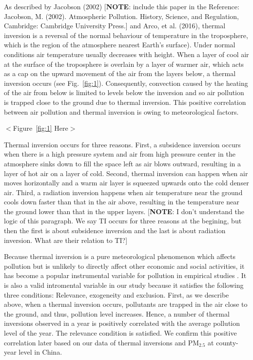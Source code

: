 \documentclass[12pt]{article}
\begin{document}
As described by Jacobson (2002) [\textbf{NOTE}: include this paper in the
Reference: Jacobson, M. (2002). Atmospheric Pollution. History, Science, and
Regulation, Cambridge: Cambridge University Press.] and Arco, et al. (2016),
thermal inversion is a reversal of the normal behaviour of temperature in
the troposphere, which is the region of the atmosphere nearest Earth's
surface). Under normal conditions air temperature usually decreases with
height. When a layer of cool air at the surface of the troposphere is
overlain by a layer of warmer air, which acts as a cap on the upward
movement of the air from the layers below, a thermal inversion occurs (see
Fig.~\ref{fig:1}). Consequently, convection caused by the heating of the air
from below is limited to levels below the inversion and so air pollution is
trapped close to the ground due to thermal inversion. This positive
correlation between air pollution and thermal inversion is owing to
meteorological factors.

\begin{center}
$<$Figure~\ref{fig:1} Here$>$
\end{center}

Thermal inversion occurs for three reasons. First, a subsidence inversion
occurs when there is a high pressure system and air from high pressure
center in the atmosphere sinks down to fill the space left as air blows
outward, resulting in a layer of hot air on a layer of cold. Second, thermal
inversion can happen when air moves horizontally and a warm air layer is
squeezed upwards onto the cold denser air. Third, a radiation inversion
happens when air temperature near the ground cools down faster than that in
the air above, resulting in the temperature near the ground lower than that
in the upper layers. [\textbf{NOTE}: I don't understand the logic of this
paragraph. We say TI occurs for three reasons at the begining, but then the
first is about subsidence inversion and the last is about radiation
inversion. What are their relation to TI?]

Because thermal inversion is a pure meteorological phenomenon which affects
pollution but is unlikely to directly affect other economic and social
activities, it has become a popular instrumental variable for pollution in
empirical studies %
\citep{arceo2016does,jans2018economic,sager2019estimating,chen2022effect,khanna2021productivity}%
. It is also a valid intromental variable in our study because it satisfies
the following three conditions: Relevance, exogeneity and exclusion. First,
as we describe above, when a thermal inversion occurs, pollutants are
trapped in the air close to the ground, and thus, pollution level increases.
Hence, a number of thermal inversions observed in a year is positively
correlated with the average pollution level of the year. The relevance
condition is satisfied. We confirm this positive correlation later based on
our data of thermal inversions and $\mathrm{PM_{2.5}}$ at county-year level
in China.
\end{document}
